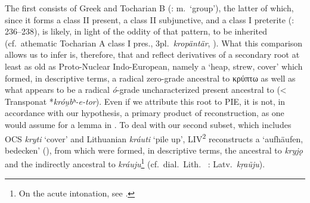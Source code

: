 \documentclass[output=paper,colorlinks,citecolor=brown]{langscibook}
\begin{document}
The first consists of Greek   and Tocharian B  (:  m.\ ‘group’), the latter of which, since it forms a class II present, a class II subjunctive, and a class I preterite (\citealt{Adams2013}: 236--238), is likely, in light of the oddity of that pattern, to be inherited (cf.\ athematic Tocharian A  class I pres., 3pl.\ \mbox{\textit{kropäntär},} \citealt[614--616]{Malzahn2010}). What this comparison allows us to infer is, therefore, that  and  reflect derivatives of a secondary root at least as old as Proto-Nuclear Indo-European, namely a  ‘heap, strew, cover’ which formed, in descriptive terms, a radical zero-grade   ancestral to κρύπτω as well as what appears to be a radical \textit{ó}-grade uncharacterized present ancestral to  (< Transponat  *\textit{króu̯bʰ-e-tor}). Even if we attribute this root to PIE, it is not, in accordance with our hypothesis, a primary product of reconstruction, as one would assume for a lemma in . To deal with our second subset, which includes OCS \textit{kryti} ‘cover’ and Lithuanian \textit{kráuti} ‘pile up’, LIV\textsuperscript{2} reconstructs a  ‘aufhäufen, bedecken’ (), from which were formed, in descriptive terms, the  ancestral to \textit{kryjǫ} and the  indirectly ancestral to \textit{kráuju}\footnote{On the acute intonation, see \citealt{VillanuevaSvensson2014}.} (cf.\ dial.\ Lith.\  : Latv.\ \textit{k\c{r}aũju}).
\end{document}

